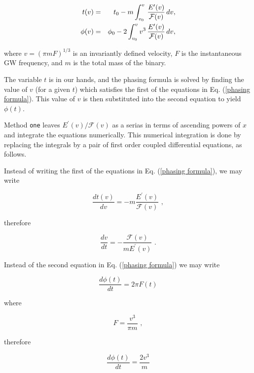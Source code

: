 \documentclass[12pt]{article}
\begin{document}
\begin{eqnarray}
t(v) & = & t_{0} - m \int_{v_{0}}^{v} \, 
\frac{E'(v)}{{\cal F}(v)} \, dv, \nonumber \\ 
\phi (v) & = & \phi_{0} - 2 \int_{v_{0}}^{v}  v^3 \, 
\frac{E'(v)}{{\cal F}(v)} \, dv,
\label{phasing formula}
\end{eqnarray}

where $v=(\pi m F)^{1/3}$ is an invariantly defined velocity, $F$ is the instantaneous GW frequency, and $m$ is the total mass of the binary. 

The variable $t$ is in our hands, and the phasing formula is solved by finding the value of $v$ (for a given $t$) which satisfies the first of the equations in Eq. (\ref{phasing formula}). This value of $v$ is then substituted into the second equation to yield $\phi(t)$.

Method \texttt{one} leaves  $E^{\prime}(v)/\mathcal{F}(v)$ as a serias in terms of ascending powers of $x$ and integrate the equations numerically. This numerical integration is done by replacing the integrals by a pair of first order coupled differential equations, as follows.

Instead of writing the first of the equations in Eq. (\ref{phasing formula}), we may write 

\begin{equation}
\frac{dt(v)}{dv} = -m \frac{E^{\prime}(v)}{\mathcal{F}(v)} \,\,,
\end{equation}

therefore

\begin{equation}
\frac{dv}{dt} = - \frac{\mathcal{F}(v)}{m E^{\prime}(v)} \,\,.
\label{ode1}
\end{equation}

Instead of the second equation in Eq. (\ref{phasing formula}) we may write

\begin{equation}
\frac{d \phi (t)}{dt} = 2 \pi F(t)
\end{equation}

where

\begin{equation}
F = \frac{v^{3}}{\pi m} \,\,,
\end{equation}

therefore

\begin{equation}
\frac{d \phi(t)}{dt} = \frac{2v^{3}}{m}
\label{ode2}
\end{equation}
\end{document}
